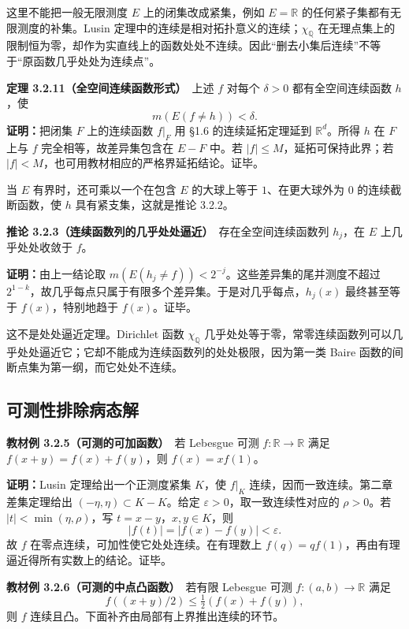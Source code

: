 \documentclass[11pt,a4paper]{article}
\begin{document}
这里不能把一般无限测度 \(E\) 上的闭集改成紧集，例如 \(E=\mathbb R\)
的任何紧子集都有无限测度的补集。Lusin
定理中的连续是相对拓扑意义的连续；\(\chi_{\mathbb Q}\)
在无理点集上的限制恒为零，却作为实直线上的函数处处不连续。因此``删去小集后连续''不等于``原函数几乎处处为连续点''。

\textbf{定理 3.2.11（全空间连续函数形式）}　上述 \(f\) 对每个
\(\delta>0\) 都有全空间连续函数 \(h\)，使 \[
m(E(f\ne h))<\delta.
\] \textbf{证明：}把闭集 \(F\) 上的连续函数 \(f|_F\) 用 §1.6
的连续延拓定理延到 \(\mathbb R^d\)。所得 \(h\) 在 \(F\) 上与 \(f\)
完全相等，故差异集包含在 \(E-F\) 中。若 \(|f|\le M\)，延拓可保持此界；若
\(|f|<M\)，也可用教材相应的严格界延拓结论。证毕。

当 \(E\) 有界时，还可乘以一个在包含 \(E\) 的大球上等于
\(1\)、在更大球外为 \(0\) 的连续截断函数，使 \(h\)
具有紧支集，这就是推论 3.2.2。

\textbf{推论 3.2.3（连续函数列的几乎处处逼近）}　存在全空间连续函数列
\(h_j\)，在 \(E\) 上几乎处处收敛于 \(f\)。

\textbf{证明：}由上一结论取
\(m(E(h_j\ne f))<2^{-j}\)。这些差异集的尾并测度不超过
\(2^{1-k}\)，故几乎每点只属于有限多个差异集。于是对几乎每点，\(h_j(x)\)
最终甚至等于 \(f(x)\)，特别地趋于 \(f(x)\)。证毕。

这不是处处逼近定理。Dirichlet 函数 \(\chi_{\mathbb Q}\)
几乎处处等于零，常零连续函数列可以几乎处处逼近它；它却不能成为连续函数列的处处极限，因为第一类
Baire 函数的间断点集为第一纲，而它处处不连续。

\subsection*{可测性排除病态解}\label{ux53efux6d4bux6027ux6392ux9664ux75c5ux6001ux89e3}

\textbf{教材例 3.2.5（可测的可加函数）}　若 Lebesgue 可测
\(f:\mathbb R\to\mathbb R\) 满足 \(f(x+y)=f(x)+f(y)\)，则
\(f(x)=xf(1)\)。

\textbf{证明：}Lusin 定理给出一个正测度紧集 \(K\)，使 \(f|_K\)
连续，因而一致连续。第二章差集定理给出 \((-\eta,\eta)\subset K-K\)。给定
\(\varepsilon>0\)，取一致连续性对应的 \(\rho>0\)。若
\(|t|<\min(\eta,\rho)\)，写 \(t=x-y\)，\(x,y\in K\)，则 \[
|f(t)|=|f(x)-f(y)|<\varepsilon.
\] 故 \(f\) 在零点连续，可加性使它处处连续。在有理数上
\(f(q)=qf(1)\)，再由有理逼近得所有实数上的结论。证毕。

\textbf{教材例 3.2.6（可测的中点凸函数）}　若有限 Lebesgue 可测
\(f:(a,b)\to\mathbb R\) 满足 \[
f((x+y)/2)\le\tfrac12(f(x)+f(y)),
\] 则 \(f\) 连续且凸。下面补齐由局部有上界推出连续的环节。
\end{document}
